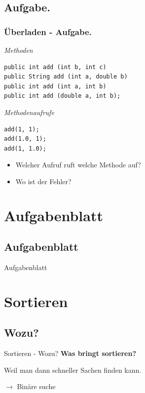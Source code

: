\documentclass[18pt]{beamer}
\begin{document}
\subsection{Aufgabe.}
\begin{frame}[containsverbatim]
	\frametitle{Überladen - Aufgabe.}

	\emph{Methoden}
	\begin{lstlisting}
public int add (int b, int c)
public String add (int a, double b)
public int add (int a, int b)
public int add (double a, int b);
	\end{lstlisting}
	
	\emph{Methodenaufrufe}
	\begin{lstlisting}
add(1, 1);
add(1.0, 1);
add(1, 1.0);
	\end{lstlisting}
	
	\begin{itemize}
		\item Welcher Aufruf ruft welche Methode auf?
		\item Wo ist der Fehler?	
	\end{itemize}
\end{frame}

\section{Aufgabenblatt}
\subsection*{Aufgabenblatt}
\begin{frame}{Aufgabenblatt}

\end{frame}

\section{Sortieren}
\subsection{Wozu?}
\begin{frame}{Sortieren - Wozu?}
	\textbf{Was bringt sortieren?}\pause
	
	Weil man dann schneller Sachen finden kann.
	
	$\rightarrow$ Binäre suche
\end{frame}
\end{document}
